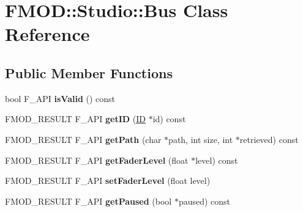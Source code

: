 \hypertarget{class_f_m_o_d_1_1_studio_1_1_bus}{\section{F\+M\+O\+D\+:\+:Studio\+:\+:Bus Class Reference}
\label{class_f_m_o_d_1_1_studio_1_1_bus}
}
\subsection*{Public Member Functions}
\begin{DoxyCompactItemize}
\item 
\hypertarget{class_f_m_o_d_1_1_studio_1_1_bus_a5369c25a3ca00fb64fd0d4893c973cc2}{bool F\+\_\+\+A\+P\+I {\bfseries is\+Valid} () const }\label{class_f_m_o_d_1_1_studio_1_1_bus_a5369c25a3ca00fb64fd0d4893c973cc2}

\item 
\hypertarget{class_f_m_o_d_1_1_studio_1_1_bus_a847d1ef4749d6273861407646632897d}{F\+M\+O\+D\+\_\+\+R\+E\+S\+U\+L\+T F\+\_\+\+A\+P\+I {\bfseries get\+I\+D} (\hyperlink{struct_f_m_o_d___g_u_i_d}{I\+D} $\ast$id) const }\label{class_f_m_o_d_1_1_studio_1_1_bus_a847d1ef4749d6273861407646632897d}

\item 
\hypertarget{class_f_m_o_d_1_1_studio_1_1_bus_ae50769537b3686dd501a8f1c23c5f4c9}{F\+M\+O\+D\+\_\+\+R\+E\+S\+U\+L\+T F\+\_\+\+A\+P\+I {\bfseries get\+Path} (char $\ast$path, int size, int $\ast$retrieved) const }\label{class_f_m_o_d_1_1_studio_1_1_bus_ae50769537b3686dd501a8f1c23c5f4c9}

\item 
\hypertarget{class_f_m_o_d_1_1_studio_1_1_bus_aade15ea678a9241bfc72d3708d3c1824}{F\+M\+O\+D\+\_\+\+R\+E\+S\+U\+L\+T F\+\_\+\+A\+P\+I {\bfseries get\+Fader\+Level} (float $\ast$level) const }\label{class_f_m_o_d_1_1_studio_1_1_bus_aade15ea678a9241bfc72d3708d3c1824}

\item 
\hypertarget{class_f_m_o_d_1_1_studio_1_1_bus_a12dad1046a258a5a032c5ea7389c723b}{F\+M\+O\+D\+\_\+\+R\+E\+S\+U\+L\+T F\+\_\+\+A\+P\+I {\bfseries set\+Fader\+Level} (float level)}\label{class_f_m_o_d_1_1_studio_1_1_bus_a12dad1046a258a5a032c5ea7389c723b}

\item 
\hypertarget{class_f_m_o_d_1_1_studio_1_1_bus_aed1f7ccac31cf6123162f18a2323b0fb}{F\+M\+O\+D\+\_\+\+R\+E\+S\+U\+L\+T F\+\_\+\+A\+P\+I {\bfseries get\+Paused} (bool $\ast$paused) const }\label{class_f_m_o_d_1_1_studio_1_1_bus_aed1f7ccac31cf6123162f18a2323b0fb}


\end{DoxyCompactItemize}
